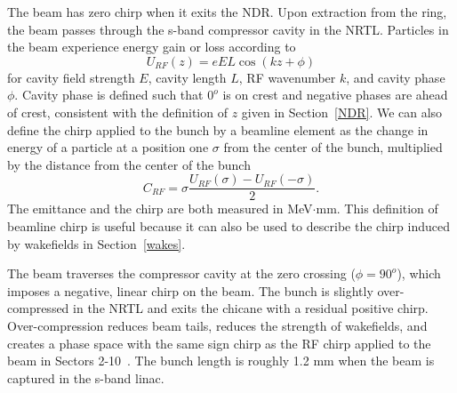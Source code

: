 \documentclass[%
twocolumn,
showpacs,preprintnumbers,
 aps,
prstab,
]{revtex4-1}
\begin{document}
The beam has zero chirp when it exits the NDR. Upon extraction from the ring, the beam passes through the s-band compressor cavity in the NRTL. Particles in the beam experience energy gain or loss according to
\begin{equation}
U_{RF}(z) = e E L \cos(kz + \phi)
\end{equation}
for cavity field strength $E$, cavity length $L$, RF wavenumber $k$, and cavity phase $\phi$. Cavity phase is defined such that $0^o$ is on crest and negative phases are ahead of crest, consistent with the definition of $z$ given in Section~\ref{NDR}. We can also define the chirp applied to the bunch by a beamline element as the change in energy of a particle at a position one $\sigma$ from the center of the bunch, multiplied by the distance from the center of the bunch
\begin{equation}
C_{RF} = \sigma \frac{U_{RF}(\sigma) - U_{RF}(-\sigma)}{2}.
\end{equation}
The emittance and the chirp are both measured in MeV$\cdot$mm. This definition of beamline chirp is useful because it can also be used to describe the chirp induced by wakefields in Section~\ref{wakes}.

The beam traverses the compressor cavity at the zero crossing ($\phi = 90^o$), which imposes a negative, linear chirp on the beam. The bunch is slightly over-compressed in the NRTL and exits the chicane with a residual positive chirp. Over-compression reduces beam tails, reduces the strength of wakefields, and creates a phase space with the same sign chirp as the RF chirp applied to the beam in Sectors 2-10~\cite{fj_over}. The bunch length is roughly 1.2 mm when the beam is captured in the s-band linac.
\end{document}
